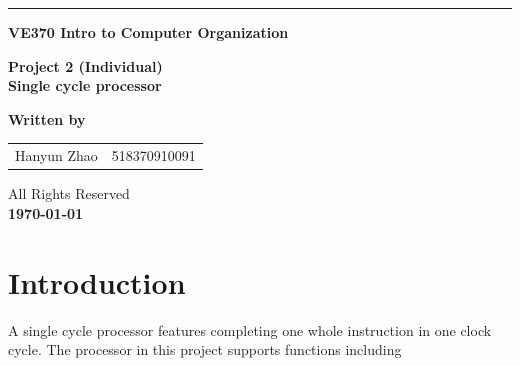 \documentclass[a4paper,12pt]{article}
\begin{document}
\begin{titlepage}

\vspace*{\fill}
\noindent\rule[0.25\baselineskip]{\textwidth}{1pt}

\begin{center}

\huge{\bfseries  VE370 Intro to Computer Organization}

\vspace{0.5cm}

\Large{\bfseries  Project 2 (Individual)}\\
\Large{\bfseries Single cycle processor}

\vspace{1cm}


 \textbf{Written by}\\
\begin{tabular}{l l}
Hanyun Zhao  & 518370910091\\

\end{tabular}


\vspace{2cm}

\small{\textcopyright All Rights Reserved\\
{\bfseries \today}\\}

\vspace{1cm}


\end{center}
\vspace*{\fill}
\end{titlepage}

\section{Introduction}
\par A single cycle processor features completing one whole instruction in one clock cycle. The processor in this project supports functions including 
\end{document}
